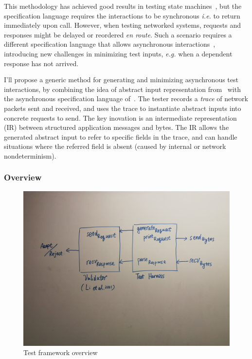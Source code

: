 \documentclass{article}
\theoremstyle{definition}
\begin{document}
This methodology has achieved good results in testing state
machines~\cite{Hughes2016}, but the specification language requires the
interactions to be synchronous {\it i.e.} to return immediately upon call.
However, when testing networked systems, requests and responses might be delayed
or reordered \textit{en route}.  Such a scenario requires a different
specification language that allows asynchronous
interactions~\cite{li2021modelbased}, introducing new challenges in minimizing
test inputs, {\it e.g.} when a dependent response has not arrived.

I'll propose a generic method for generating and minimizing asynchronous test
interactions, by combining the idea of abstract input representation
from~\textcite{Hughes2007} with the asynchronous specification language
of~\textcite{li2021modelbased}.  The tester records a {\em trace} of network
packets sent and received, and uses the trace to instantiate abstract inputs
into concrete requests to send.  The key inovation is an intermediate
representation (IR) between structured application messages and bytes.  The IR
allows the generated abstract input to refer to specific fields in the trace,
and can handle situations where the referred field is absent (caused by internal
or network nondeterminism).

\subsubsection{Overview}
\begin{figure}
  \centering
  \includegraphics[width=.9\textwidth]{figures/overview}
  \caption{Test framework overview}
  \label{fig:overview}
\end{figure}
\end{document}
